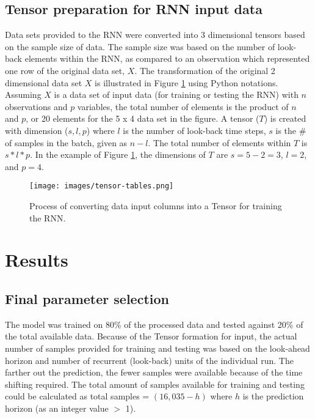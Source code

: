 \subsection{Tensor preparation for RNN input data}
Data sets provided to the RNN were converted into 3 dimensional tensors based on the sample size of data. The sample size was based on the number of look-back elements within the RNN, as compared to an observation which represented one row of the original data set, $X$.  The transformation of the original 2 dimensional data set $X$ is illustrated in Figure \ref{fig:tensor-tables} using Python notations. Assuming $X$ is a data set of input data (for training or testing the RNN) with $n$ observations and $p$ variables, the total number of elements is the product of $n$ and $p$, or 20 elements for the 5 x 4 data set in the figure. A tensor ($T$) is created with dimension ($s, l, p$) where $l$ is the number of look-back time steps, $s$ is the \# of samples in the batch, given as $n - l$. The total number of elements within $T$ is $s*l*p$. In the example of Figure \ref{fig:tensor-tables}, the dimensions of $T$ are $s = 5 - 2 = 3$, $l = 2$, and $p = 4$.    
%
\begin{figure}[H]
\centering
\texttt{[image: images/tensor-tables.png]}
\caption{Process of converting data input columns into a Tensor for training the RNN.}
\label{fig:tensor-tables}
\end{figure}

\section{Results}

\subsection{Final parameter selection}
The model was trained on 80\% of the processed data and tested against 20\% of the total available data. Because of the Tensor formation for input, the actual number of samples provided for training and testing was based on the look-ahead horizon and number of recurrent (look-back) units of the individual run. The farther out the prediction, the fewer samples were available because of the time shifting required. The total amount of samples available for training and testing could be calculated as total samples = $(16,035 - h)$ where $h$ is the prediction horizon (as an integer value $>$ 1). 

